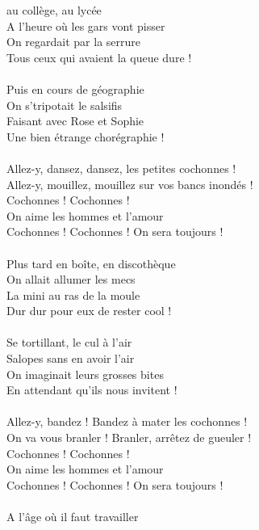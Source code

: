 
 au collège, au lycée
\\A l'heure où les gars vont pisser
\\On regardait par la serrure
\\Tous ceux qui avaient la queue dure !
\\\\Puis en cours de géographie
\\On s'tripotait le salsifis
\\Faisant avec Rose et Sophie
\\Une bien étrange chorégraphie !
\\\\Allez-y, dansez, dansez, les petites cochonnes !
\\Allez-y, mouillez, mouillez sur vos bancs inondés !
\\Cochonnes ! Cochonnes !
\\On aime les hommes et l'amour
\\Cochonnes ! Cochonnes ! On sera toujours !
\\\\Plus tard en boîte, en discothèque
\\On allait allumer les mecs
\\La mini au ras de la moule
\\Dur dur pour eux de rester cool !
\\\\Se tortillant, le cul à l'air
\\Salopes sans en avoir l'air
\\On imaginait leurs grosses bites
\\En attendant qu'ils nous invitent !
\\\\Allez-y, bandez ! Bandez à mater les cochonnes !
\\On va vous branler ! Branler, arrêtez de gueuler !
\\Cochonnes ! Cochonnes !
\\On aime les hommes et l'amour
\\Cochonnes ! Cochonnes ! On sera toujours !
\\\\A l'âge où il faut travailler
